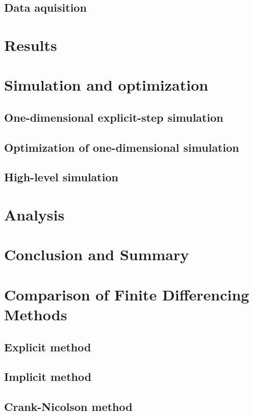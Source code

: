 \documentclass[letterpaper,titlepage,oneside]{report}
\begin{document}
\section{Data aquisition}

\chapter{Results}
\label{ch:results}

\chapter{Simulation and optimization}
\label{ch:simulation}

\section{One-dimensional explicit-step simulation}

\section{Optimization of one-dimensional simulation}

\section{High-level simulation}

\chapter{Analysis}
\label{ch:analysis}

\chapter{Conclusion and Summary}
\label{ch:conclusion}

\appendix

\chapter{Comparison of Finite Differencing Methods}
\label{ch:finitediff}

\section{Explicit method}

\section{Implicit method}

\section{Crank-Nicolson method}
\end{document}
